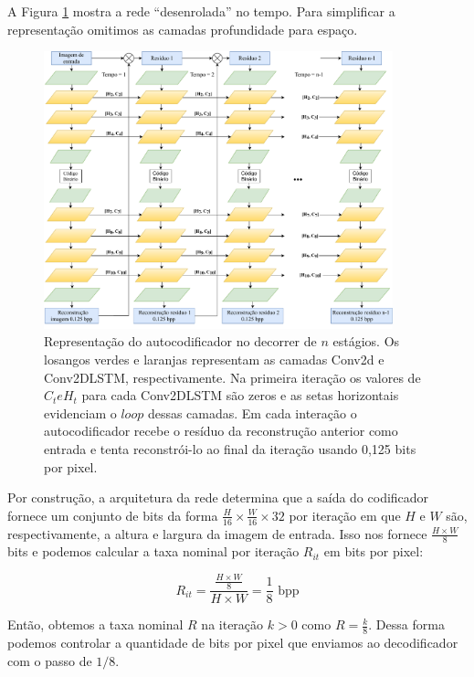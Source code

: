 A Figura \ref{fig:rede_toderici} mostra a rede ``desenrolada'' no tempo. Para simplificar a representação omitimos as camadas profundidade para espaço.

\begin{figure}[htbp]
	\centering
	\includegraphics[width=0.90\textwidth]{figuras/redeTCC.pdf}
	\caption[Autocodificador desenrolado no tempo]{Representação do autocodificador no decorrer de $n$ estágios. Os losangos verdes e laranjas representam as camadas Conv2d e Conv2DLSTM, respectivamente.  Na primeira iteração os valores de $C_t e H_t$ para cada Conv2DLSTM são zeros e as setas horizontais evidenciam o $loop$ dessas camadas. Em cada interação o autocodificador recebe o resíduo da reconstrução anterior como entrada e tenta reconstrói-lo ao final da iteração usando 0,125 bits por pixel.}
	\label{fig:rede_toderici}
\end{figure}


Por construção, a arquitetura da rede determina que a saída do codificador fornece um conjunto de bits da forma $\frac{H}{16} \times \frac{W}{16} \times 32$ por iteração em que $H$ e $W$ são, respectivamente, a altura e largura da imagem de entrada. Isso nos fornece $\frac{H \times W}{8}$ bits e podemos calcular a taxa nominal por iteração $R_{it}$ em bits por pixel:

\begin{equation}
\label{eq:bpp}
R_{it} = \frac{\frac{H \times W}{8}}{H \times W} =  \frac{1}{8}\text{ bpp} 
\end{equation}

Então, obtemos a taxa nominal $R$ na iteração $k>0$ como $R =\frac{k}{8} $.  Dessa forma podemos controlar a quantidade de bits por pixel que enviamos ao decodificador com o passo de $1/8$. 


